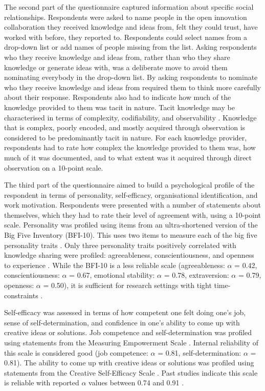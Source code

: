 The second part of the questionnaire captured information about specific social relationships. Respondents were asked to name people in the open innovation collaboration they received knowledge and ideas from, felt they could trust, have worked with before, they reported to. Respondents could select names from a drop-down list or add names of people missing from the list. Asking respondents who they receive knowledge and ideas from, rather than who they share knowledge or generate ideas with, was a deliberate move to avoid them nominating everybody in the drop-down list. By asking respondents to nominate who they receive knowledge and ideas from required them to think more carefully about their response. Respondents also had to indicate how much of the knowledge provided to them was tacit in nature. Tacit knowledge may be characterised in terms of complexity, codifiability, and observability \citep{winter987knowledge,zander1995knowledge,cavusgil2003tacit}. Knowledge that is complex, poorly encoded, and mostly acquired through observation is considered to be predominantly tacit in nature. For each knowledge provider, respondents had to rate how complex the knowledge provided to them was, how much of it was documented, and to what extent was it acquired through direct observation on a 10-point scale.\medskip 

The third part of the questionnaire aimed to build a psychological profile of the respondent in terms of personality, self-efficacy, organisational identification, and work motivation. Respondents were presented with a number of statements about themselves, which they had to rate their level of agreement with, using a 10-point scale. Personality was profiled using items from an ultra-shortened version of the Big Five Inventory (BFI-10). This uses two items to measure each of the big five personality traits \citep{rammstedt2007measuring}. Only three personality traits positively correlated with knowledge sharing were profiled: agreeableness, conscientiousness, and openness to experience \citep{matzler2008personality,matzler2011personality}. While the BFI-10 is a less reliable scale (agreeableness: $\alpha$ = 0.42, conscientiousness: $\alpha$ = 0.67, emotional stability: $\alpha$ = 0.78, extraversion: $\alpha$ = 0.79, openness: $\alpha$ = 0.50), it is sufficient for research settings with tight time-constraints \citep{rammstedt2007measuring}.\medskip

Self-efficacy was assessed in terms of how competent one felt doing one's job, sense of self-determination, and confidence in one's ability to come up with creative ideas or solutions. Job competence and self-determination was profiled using statements from the Measuring Empowerment Scale \citep{spreitzer1995psychological}. Internal reliability of this scale is considered good (job competence: $\alpha$ = 0.81, self-determination: $\alpha$ = 0.81). The ability to come up with creative ideas or solutions was profiled using statements from the Creative Self-Efficacy Scale \citep{tierney2002creative}. Past studies indicate this scale is reliable with reported $\alpha$ values between 0.74 and 0.91 \citep{tierney2002creative,gong2009employee,tierney2011creative,mittal2015transformational}.\medskip

